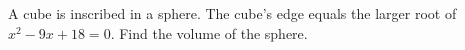 A cube is inscribed in a sphere. The cube's edge equals the larger root of $x^2-9x+18=0$. Find the volume of the sphere.

